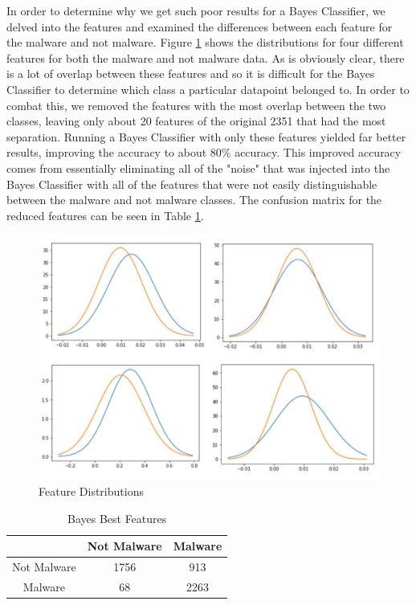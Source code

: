 \documentclass[12pt]{article}
\begin{document}
In order to determine why we get such poor results for a Bayes Classifier, we delved into the features and examined the differences between each feature for the malware and not malware. Figure \ref{fig:feature_distributions} shows the distributions for four different features for both the malware and not malware data. As is obviously clear, there is a lot of overlap between these features and so it is difficult for the Bayes Classifier to determine which class a particular datapoint belonged to. In order to combat this, we removed the features with the most overlap between the two classes, leaving only about 20 features of the original 2351 that had the most separation. Running a Bayes Classifier with only these features yielded far better results, improving the accuracy to about 80\% accuracy. This improved accuracy comes from essentially eliminating all of the "noise" that was injected into the Bayes Classifier with all of the features that were not easily distinguishable between the malware and not malware classes. The confusion matrix for the reduced features can be seen in Table \ref{tab:bayes_best_features}.



\begin{figure}[H]
\centering
\includegraphics[width=.5\textheight]{Features}
\caption{Feature Distributions}
\label{fig:feature_distributions}
\end{figure}

\begin{table}[]
    \centering
    \begin{tabular}{|c|c|c|}
        \hline
         & Not Malware & Malware  \\
         \hline
        Not Malware & 1756 & 913 \\
        \hline
        Malware & 68 & 2263 \\
        \hline
    \end{tabular}
    \caption{Bayes Best Features}
    \label{tab:bayes_best_features}
\end{table}
\end{document}
